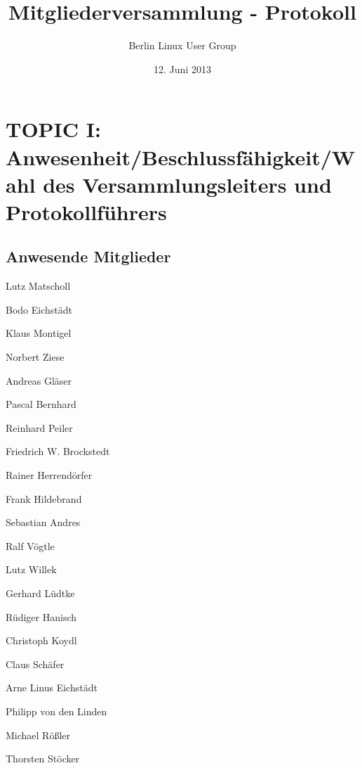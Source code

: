 \documentclass[11pt,a4paper,ngerman]{article}
\title{Mitgliederversammlung - Protokoll}
\author{Berlin Linux User Group}
\date{12. Juni 2013}
\begin{document}

\maketitle
\thispagestyle{empty}
\newpage


\setcounter{tocdepth}{2}
\tableofcontents

\newpage




\section{TOPIC I: Anwesenheit/Beschlussfähigkeit/Wahl des Versammlungsleiters 
und Protokollführers}

  \subsection{Anwesende Mitglieder}

    \begin{itemize*}
      \item Lutz Matscholl
      \item Bodo Eichstädt
      \item Klaus Montigel
      \item Norbert Ziese
      \item Andreas Gläser
      \item Pascal Bernhard
      \item Reinhard Peiler
      \item Friedrich W. Brockstedt
      \item Rainer Herrendörfer
      \item Frank Hildebrand
      \item Sebastian Andres
      \item Ralf Vögtle
      \item Lutz Willek
      \item Gerhard Lüdtke
      \item Rüdiger Hanisch
      \item Christoph Koydl
      \item Claus Schäfer
      \item Arne Linus Eichstädt
      \item Philipp von den Linden
      \item Michael Rößler
      \item Thorsten Stöcker


   \end{itemize*}
\end{document}
